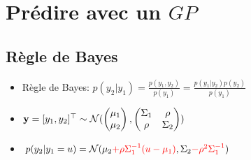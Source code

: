 \documentclass[xcolor=svgnames, t]{beamer}
\newcommand{\vectorx}[1]{\boldsymbol{\MakeLowercase{\mathbf{#1}}}}
\newcommand{\tored}[1]{\textcolor{red}{#1}}
\begin{document}
\section{Prédire avec un $GP$}
\subsection{Règle de Bayes}
\begin{frame}{\subsecname}  
  \begin{itemize}
    \item<1-> Règle de Bayes: 
    $p(y_2| y_1)
    = \frac{p(y_1, y_2)}{p(y_1)}
    = \frac{p(y_1 | y_2) p(y_2)}{p(y_1)}
    $%
    \item<2-> $  \vectorx{y} = [y_1, y_2]^\top \sim \mathcal{N} (
      \begin{pmatrix}
        \mu_1 \\
        \mu_2
      \end{pmatrix},
        \begin{pmatrix}
          \Sigma_{1} & \rho \\
          \rho & \Sigma_{2}
        \end{pmatrix}
    )$%
    \item<3-6> $
    p(y_2 | y_1 = u) = \mathcal{N} (
      \mu_2 \tored{+ \rho \Sigma_1^{-1} (u - \mu_1)},
      \Sigma_2 \tored{- \rho^2 \Sigma_1^{-1}}
    )$%
  \end{itemize}%
  \begin{figure}
    \centering

\end{figure}
\end{frame}
\end{document}
